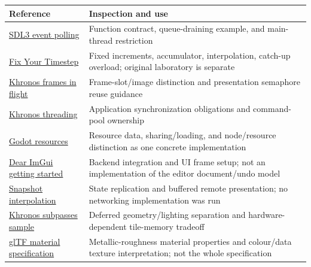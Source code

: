 {\def\LTcaptype{none} %
\begin{longtable}[]{@{}
  >{\raggedright\arraybackslash}p{}
  >{\raggedright\arraybackslash}p{}@{}}
\toprule\noalign{}
\begin{minipage}[b]{\linewidth}\raggedright
Reference
\end{minipage} & \begin{minipage}[b]{\linewidth}\raggedright
Inspection and use
\end{minipage} \\
\midrule\noalign{}
\endhead
\bottomrule\noalign{}
\endlastfoot
\href{https://wiki.libsdl.org/SDL3/SDL_PollEvent}{SDL3 event polling} & Function contract, queue-draining example, and main-thread restriction \\
\href{https://gafferongames.com/post/fix_your_timestep/}{Fix Your Timestep} & Fixed increments, accumulator, interpolation, catch-up overload; original laboratory is separate \\
\href{https://docs.vulkan.org/tutorial/latest/03_Drawing_a_triangle/03_Drawing/03_Frames_in_flight.html}{Khronos frames in flight} & Frame-slot/image distinction and presentation semaphore reuse guidance \\
\href{https://docs.vulkan.org/guide/latest/threading.html}{Khronos threading} & Application synchronization obligations and command-pool ownership \\
\href{https://docs.godotengine.org/en/stable/tutorials/scripting/resources.html}{Godot resources} & Resource data, sharing/loading, and node/resource distinction as one concrete implementation \\
\href{https://github.com/ocornut/imgui/wiki/Getting-Started}{Dear ImGui getting started} & Backend integration and UI frame setup; not an implementation of the editor document/undo model \\
\href{https://gafferongames.com/post/snapshot_interpolation/}{Snapshot interpolation} & State replication and buffered remote presentation; no networking implementation was run \\
\href{https://docs.vulkan.org/samples/latest/samples/performance/subpasses/README.html}{Khronos subpasses sample} & Deferred geometry/lighting separation and hardware-dependent tile-memory tradeoff \\
\href{https://registry.khronos.org/glTF/specs/2.0/glTF-2.0.html\#materials}{glTF material specification} & Metallic-roughness material properties and colour/data texture interpretation; not the whole specification \\
\end{longtable}
}

